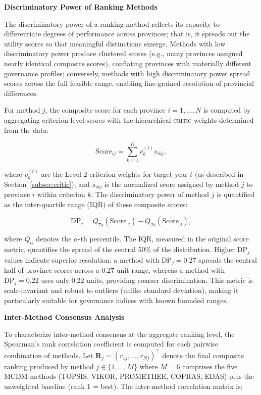\documentclass[12pt,a4paper]{article}
\newcommand{\CRITIC}{\textsc{critic}\xspace}
\begin{document}
\textbf{Discriminatory Power of Ranking Methods}

The discriminatory power of a ranking method reflects its capacity to differentiate degrees of performance across provinces; that is, it spreads out the utility scores so that meaningful distinctions emerge. Methods with low discriminatory power produce clustered scores (e.g., many provinces assigned nearly identical composite scores), conflating provinces with materially different governance profiles; conversely, methods with high discriminatory power spread scores across the full feasible range, enabling fine-grained resolution of provincial differences.

For method $j$, the composite score for each province $i = 1, \ldots, N$ is computed by aggregating criterion-level scores with the hierarchical \CRITIC weights determined from the data:

\begin{equation}
\label{eq:composite_score}
\mathrm{Score}_{ij} = \sum_{k=1}^{K} v_k^{(t)} s_{ikj},
\end{equation}

where $v_k^{(t)}$ are the Level 2 criterion weights for target year $t$ (as described in Section~\ref{subsec:critic}), and $s_{ikj}$ is the normalized score assigned by method $j$ to province $i$ within criterion $k$. The discriminatory power of method $j$ is quantified as the inter-quartile range (IQR) of these composite scores:

\begin{equation}
\label{eq:discriminatory_power}
\mathrm{DP}_j = Q_{75}(\mathrm{Score}_{\cdot j}) - Q_{25}(\mathrm{Score}_{\cdot j}),
\end{equation}

where $Q_{\alpha}$ denotes the $\alpha$-th percentile. The IQR, measured in the original score metric, quantifies the spread of the central 50\% of the distribution. Higher $\mathrm{DP}_j$ values indicate superior resolution: a method with $\mathrm{DP}_j = 0.27$ spreads the central half of province scores across a 0.27-unit range, whereas a method with $\mathrm{DP}_j = 0.22$ uses only 0.22 units, providing coarser discrimination. This metric is scale-invariant and robust to outliers (unlike standard deviation), making it particularly suitable for governance indices with known bounded ranges.

\textbf{Inter-Method Consensus Analysis}

To characterize inter-method consensus at the aggregate ranking level, the Spearman's rank correlation coefficient is computed for each pairwise combination of methods. Let $\mathbf{R}_j = (r_{1j}, \ldots, r_{Nj})^\top$ denote the final composite ranking produced by method $j \in \{1, \ldots, M\}$ where $M=6$ comprises the five MCDM methods (TOPSIS, VIKOR, PROMETHEE, COPRAS, EDAS) plus the unweighted baseline (rank 1 = best). The inter-method correlation matrix is:
\end{document}
